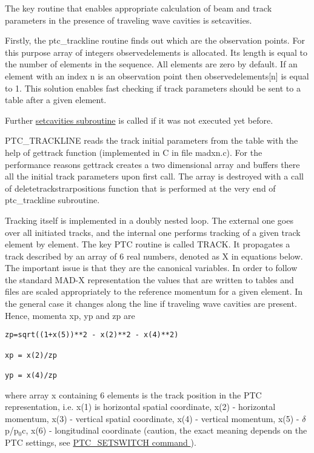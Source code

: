 The key routine that enables appropriate calculation of beam and track
parameters in the presence of traveling wave cavities is setcavities.  

Firstly, the ptc\_trackline routine finds out which are the observation
points. For this purpose array of integers observedelements is
allocated. Its length is equal to the number of elements in the
sequence. All elements are zero by default. If an element with an index
n is an observation point then observedelements[n] is equal to 1. This
solution enables fast checking if track parameters should be sent to a
table after a given element.  

Further \href{../ptc_auxiliaries/PTC_SetCavities.html}{setcavities
  subroutine} is called if it was not executed yet before.   

PTC\_TRACKLINE reads the track initial parameters from the table with
the help of gettrack function (implemented in C in file madxn.c). For
the performance reasons gettrack creates a two dimensional array and
buffers there all the initial track parameters upon first call. The
array is destroyed with a call of deletetrackstrarpositions function
that is performed at the very end of ptc\_trackline subroutine.  

Tracking itself is implemented in a doubly nested loop.  The external
one goes over all initiated tracks,  and the internal one performs
tracking of a given track element by element. The key PTC routine is
called TRACK. It propagates a track described by an array of 6 real
numbers, denoted as X in equations below. The important issue is that
they are the canonical variables. In order to follow the standard MAD-X
representation the values that are written to tables and files are
scaled appropriately to the reference momentum for a given element. In
the general case it changes along the line if traveling wave cavities
are present. Hence, momenta xp, yp and zp are  

\begin{verbatim}
zp=sqrt((1+x(5))**2 - x(2)**2 - x(4)**2) 
     
xp = x(2)/zp
     
yp = x(4)/zp
\end{verbatim}  

where array x containing 6 elements is the track position in the PTC
representation, i.e. x(1) is horizontal spatial coordinate, x(2) -
horizontal momentum, x(3) - vertical spatial coordinate, x(4) - vertical
momentum, x(5) - $\delta$p/p$_0$c, x(6) - longitudinal coordinate
(caution, the exact meaning depends on the PTC settings, see
\href{../ptc_auxiliaries/PTC_SetSwitch.html}{ PTC\_SETSWITCH command }).   


